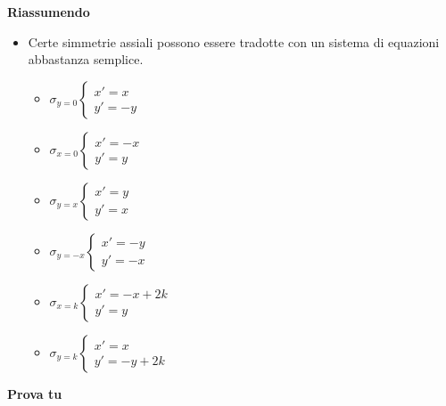\textbf{Riassumendo}
\begin{itemize} [noitemsep]
\item Certe simmetrie assiali possono essere tradotte con un sistema di 
equazioni
abbastanza semplice.
\begin{itemize} [noitemsep]
\item \(\sigma_{y = 0} \left \{
\begin{array}{l} x' = x \\ y' = -y \end{array} \right .\)
\item \(\sigma_{x = 0} \left \{
\begin{array}{l} x' = -x \\ y' = y \end{array} \right .\)
\item \(\sigma_{y = x} \left \{
\begin{array}{l} x' = y \\ y' = x \end{array} \right .\)
\item \(\sigma_{y = -x} \left \{
\begin{array}{l} x' = -y \\ y' = -x \end{array} \right .\)
\item \(\sigma_{x = k} \left \{
\begin{array}{l} x' = -x + 2k \\ y' = y \end{array} \right .\)
\item \(\sigma_{y = k} \left \{
\begin{array}{l} x' = x \\ y' = -y + 2k \end{array} \right .\)

\end{itemize}

\end{itemize}

\textbf{Prova tu}

